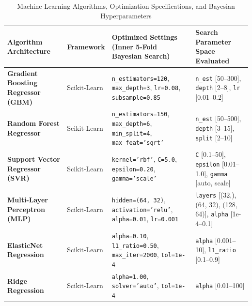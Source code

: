 \documentclass[journal]{IEEEtran}
\begin{document}
\begin{table}[!t]
\caption{Machine Learning Algorithms, Optimization Specifications, and Bayesian Hyperparameters}
\label{tab:hyperparams}
\centering
\begin{tabular}{llll}
\toprule
\textbf{Algorithm Architecture} & \textbf{Framework} & \textbf{Optimized Settings (Inner 5-Fold Bayesian Search)} & \textbf{Search Parameter Space Evaluated} \\
\midrule
\textbf{Gradient Boosting Regressor (GBM)} & Scikit-Learn & \texttt{n\_estimators=120}, \texttt{max\_depth=3}, \texttt{lr=0.08}, \texttt{subsample=0.85} & \texttt{n\_est} [50--300], \texttt{depth} [2--8], \texttt{lr} [0.01--0.2] \\
\textbf{Random Forest Regressor} & Scikit-Learn & \texttt{n\_estimators=150}, \texttt{max\_depth=6}, \texttt{min\_split=4}, \texttt{max\_feat='sqrt'} & \texttt{n\_est} [50--500], \texttt{depth} [3--15], \texttt{split} [2--10] \\
\textbf{Support Vector Regressor (SVR)} & Scikit-Learn & \texttt{kernel='rbf'}, \texttt{C=5.0}, \texttt{epsilon=0.20}, \texttt{gamma='scale'} & \texttt{C} [0.1--50], \texttt{epsilon} [0.01--1.0], \texttt{gamma} [auto, scale] \\
\textbf{Multi-Layer Perceptron (MLP)} & Scikit-Learn & \texttt{hidden=(64, 32)}, \texttt{activation='relu'}, \texttt{alpha=0.01}, \texttt{lr=0.001} & \texttt{layers} [(32,), (64, 32), (128, 64)], \texttt{alpha} [1e-4--0.1] \\
\textbf{ElasticNet Regression} & Scikit-Learn & \texttt{alpha=0.10}, \texttt{l1\_ratio=0.50}, \texttt{max\_iter=2000}, \texttt{tol=1e-4} & \texttt{alpha} [0.001--10], \texttt{l1\_ratio} [0.1--0.9] \\
\textbf{Ridge Regression} & Scikit-Learn & \texttt{alpha=1.00}, \texttt{solver='auto'}, \texttt{tol=1e-4} & \texttt{alpha} [0.01--100] \\
\bottomrule
\end{tabular}
\end{table}

\clearpage
\end{document}
